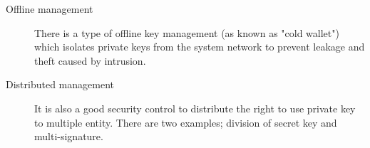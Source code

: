 \begin{description}
 \item[Offline management]
       There is a type of offline key management (as known as "cold wallet") which isolates private keys from the system network to prevent leakage and theft caused by intrusion.


 \item[Distributed management]
       It is also a good security control to distribute the right to use private key to multiple entity. There are two examples; division of secret key and multi-signature.
\end{description}


%
%

